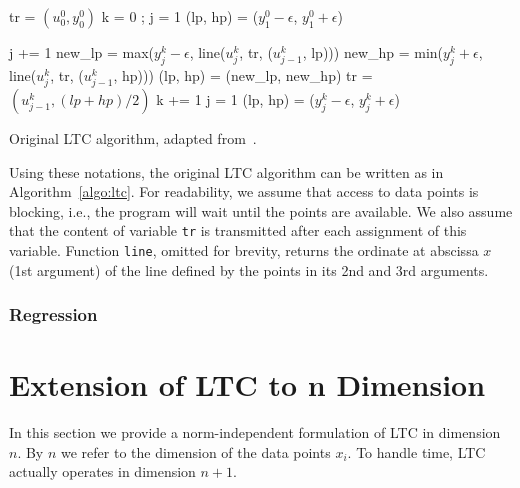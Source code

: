 \documentclass{report}
\begin{document}
\begin{algorithm}
\begin{algorithmic}[1]
\Input
   \newline
   \newline
\EndInput
\Output
   \newline
\EndOutput
\State tr = $(u^0_0, y^0_0)$ 
\State k = 0 ; j = 1
\State (lp, hp) = ($y^0_1 - \epsilon$, $y^0_1 + \epsilon$) 

 
    \State j += 1
    \State new\_lp = max($y^k_j-\epsilon$, line($u^k_j$, tr, ($u^k_{j-1}$, lp)))
    \State new\_hp = min($y^k_j+\epsilon$, line($u^k_j$, tr, ($u^k_{j-1}$, hp)))
     
        \State (lp, hp) = (new\_lp, new\_hp)
    \Else
        \State tr = $(u^k_{j-1}, (lp+hp)/2)$
        \State k += 1
        \State j = 1
        \State (lp, hp) = ($y^k_j-\epsilon$, $y^k_j+\epsilon$)
    \EndIf
\EndWhile
\end{algorithmic}
\caption{Original LTC algorithm, adapted from~\cite{schoellhammer2004lightweight}.}
\label{algo:ltc}
\end{algorithm}

Using these notations, the original LTC algorithm can
be written as in Algorithm~\ref{algo:ltc}. For readability, we assume
that access to data points is blocking, i.e., the program will wait
until the points are available. We also assume that the content of
variable \texttt{tr} is transmitted after each assignment of this
variable. Function \texttt{line}, omitted for brevity, returns the
ordinate at abscissa $x$ (1st argument) of the line defined by the points
in its 2nd and 3rd arguments.

\subsection{Regression}


\chapter{Extension of LTC to n Dimension}
In this section we provide a norm-independent formulation of LTC in
dimension $n$. By $n$ we refer to the dimension of the data points
$x_i$. To handle time, LTC actually operates in dimension
$n+1$.
\end{document}
